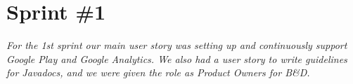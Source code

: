 \chapter{Sprint \#1} \label{ChapSprint1}
\textit{For the 1st sprint our main user story was setting up and continuously support Google Play and Google Analytics. We also had a user story to write guidelines for Javadocs, and we were given the role as Product Owners for B\&D.}





